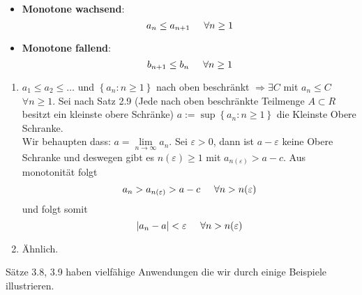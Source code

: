 \begin{definition}{3.10}
\begin{itemize}
\item \textbf{Monotone wachsend}: \[a_n\leq a_{n+1}\hspace{5mm}\forall n\geq 1\]
\item \textbf{Monotone fallend}: \[b_{n+1}\leq b_{n}\hspace{5mm}\forall n\geq 1\]
\end{itemize}
\end{definition}

\begin{beweis}{3.9}
\begin{enumerate}[\hspace{2mm}i)]
\item $a_1\leq a_2\leq \dots$ und $\left\{ a_n:n\geq 1\right\}$ nach oben beschränkt $\Rightarrow\exists C$ mit $a_n\leq C$ $\forall n\geq 1$. Sei nach Satz 2.9 (Jede nach oben beschränkte Teilmenge $A\subset R$ besitzt ein kleinste obere Schränke)   $a:=\sup \left\{ a_n:n\geq 1\right\}$ die Kleinste Obere Schranke. \\

Wir behaupten dass: $a = \mathop {\lim }\limits_{n \to \infty } {a_n}$. Sei $\varepsilon>0$, dann ist $a-\varepsilon$ keine Obere Schranke und deswegen gibt es $n(\varepsilon)\geq 1$ mit $a_{n(\varepsilon)}>a-c$. Aus monotonität folgt 
\[a_n>a_{n(\varepsilon)} > a-c\hspace{5mm}\forall n>n(\varepsilon)\]
und folgt somit 
\[ \left| a_n-a\right| < \varepsilon\hspace{5mm}\forall n> n(\varepsilon)\]
\item Ähnlich.
\end{enumerate}
\end{beweis}
Sätze 3.8, 3.9 haben vielfähige Anwendungen die wir durch einige Beispiele illustrieren.
